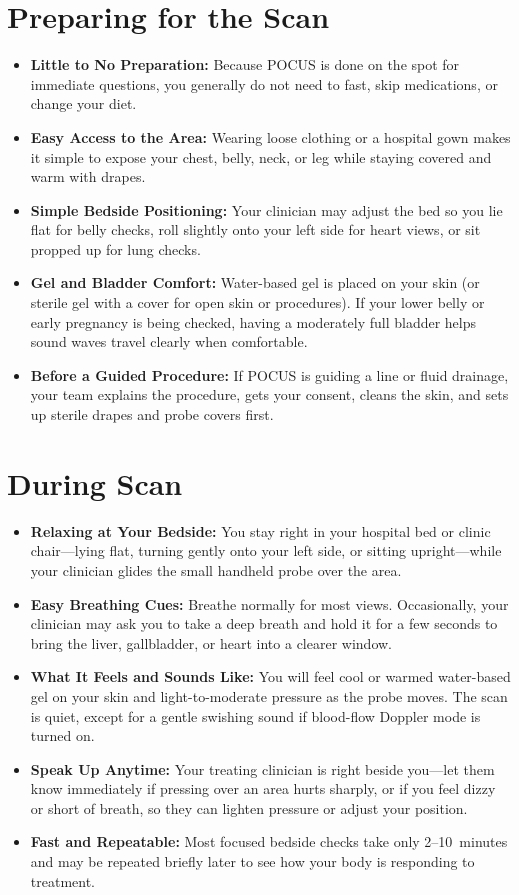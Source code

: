 \section{Preparing for the Scan}

\begin{itemize}
    \item \textbf{Little to No Preparation:} Because POCUS is done on the spot for immediate questions, you generally do not need to fast, skip medications, or change your diet.
    \item \textbf{Easy Access to the Area:} Wearing loose clothing or a hospital gown makes it simple to expose your chest, belly, neck, or leg while staying covered and warm with drapes.
    \item \textbf{Simple Bedside Positioning:} Your clinician may adjust the bed so you lie flat for belly checks, roll slightly onto your left side for heart views, or sit propped up for lung checks.
    \item \textbf{Gel and Bladder Comfort:} Water-based gel is placed on your skin (or sterile gel with a cover for open skin or procedures). If your lower belly or early pregnancy is being checked, having a moderately full bladder helps sound waves travel clearly when comfortable.
    \item \textbf{Before a Guided Procedure:} If POCUS is guiding a line or fluid drainage, your team explains the procedure, gets your consent, cleans the skin, and sets up sterile drapes and probe covers first.
\end{itemize}

\section{During Scan}

\begin{itemize}
    \item \textbf{Relaxing at Your Bedside:} You stay right in your hospital bed or clinic chair---lying flat, turning gently onto your left side, or sitting upright---while your clinician glides the small handheld probe over the area.
    \item \textbf{Easy Breathing Cues:} Breathe normally for most views. Occasionally, your clinician may ask you to take a deep breath and hold it for a few seconds to bring the liver, gallbladder, or heart into a clearer window.
    \item \textbf{What It Feels and Sounds Like:} You will feel cool or warmed water-based gel on your skin and light-to-moderate pressure as the probe moves. The scan is quiet, except for a gentle swishing sound if blood-flow Doppler mode is turned on.
    \item \textbf{Speak Up Anytime:} Your treating clinician is right beside you---let them know immediately if pressing over an area hurts sharply, or if you feel dizzy or short of breath, so they can lighten pressure or adjust your position.
    \item \textbf{Fast and Repeatable:} Most focused bedside checks take only 2--10~minutes and may be repeated briefly later to see how your body is responding to treatment.
\end{itemize}

